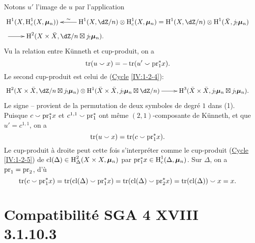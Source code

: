 Notons $u'$ l'image de $u$ par l'application 
\begin{align*}
&\xymatrix{
  \h^1(X,\h_c^1(X,\dmu_n)) 
    & \ar[l]_-\sim \h^1(X,\dZ/n) \otimes \h_c^1(X,\dmu_n) = \h^1(X,\dZ/n)\otimes \h^1(\bar X,j_!\dmu_n)
} \\
&\xymatrix{
  \ar[r] 
    & \h^2(X\times \bar X,\dZ/n\boxtimes j_!\dmu_n) \text{.}
}
\end{align*}
Vu la relation entre K\"unneth et cup-produit, on a 
\[
  \operatorname{tr}(u\smallsmile x) = -\operatorname{tr}(u'\smallsmile \mathrm{pr}_1^\ast x) \text{.}
\]
Le second cup-produit est celui de (\hyperref[IV]{Cycle} \ref{IV:1-2-4}):
\[\xymatrix{
  \h^2(X\times \bar X,\dZ/n\boxtimes j_!\dmu_n) \otimes \h^1(\bar X\times \bar X,j_!\dmu_n\boxtimes \dZ/n) \ar[r] 
    & \h^3(\bar X\times \bar X,j_!\dmu_n \boxtimes j_!\dmu_n) \text{.}
}\]
Le signe -- provient de la permutation de deux symboles de degré $1$ dans 
(1). Puisque $c\smallsmile\mathrm{pr}_1^\ast x$ et 
$c^{1,1}\smallsmile \mathrm{pr}_1^\ast$ ont même $(2,1)$-composante de 
K\"unneth, et que $u'=c^{1,1}$, on a 
\[
  \operatorname{tr}(u\smallsmile x) = \operatorname{tr}(c\smallsmile \mathrm{pr}_1^\ast x) \text{.}
\]
Le cup-produit à droite peut cette fois s'interpréter comme le 
cup-produit (\hyperref[IV]{Cycle} \ref{IV:1-2-5}) de 
$\operatorname{cl}(\Delta)\in \operatorname{H}_\Delta^2(X\times X,{\bm\mu}_n)$ par 
$\mathrm{pr}_1^\ast x\in \operatorname{H}_c^1(\Delta,{\bm\mu}_n)$. Sur $\Delta$, on a 
$\mathrm{pr}_1=\mathrm{pr}_2$, d'ù 
\[
  \operatorname{tr}(c\smallsmile \mathrm{pr}_1^\ast x) = \operatorname{tr}(\operatorname{cl}(\Delta)\smallsmile \mathrm{pr}_1^\ast x) = \operatorname{tr}(\operatorname{cl}(\Delta)\smallsmile \mathrm{pr}_2^\ast x) = \operatorname{tr}(\operatorname{cl}(\Delta))\smallsmile x = x \text{.}
\]










\section{Compatibilité SGA 4 XVIII 3.1.10.3}\label{V:4}

